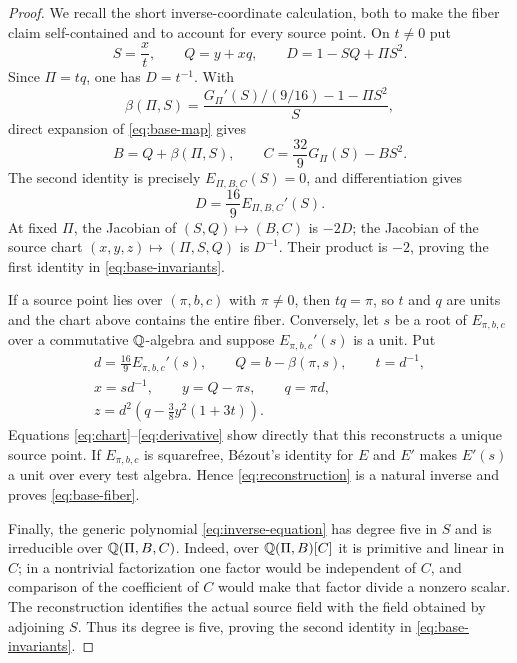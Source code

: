 \begin{proof}
We recall the short inverse-coordinate calculation, both to make the fiber
claim self-contained and to account for every source point.  On \(t\ne0\)
put
\begin{equation}
 S=\frac{x}{t},\qquad Q=y+xq,\qquad
 D=1-SQ+\Pi S^2.\label{eq:chart}
\end{equation}
Since \(\Pi=tq\), one has \(D=t^{-1}\).  With
\begin{equation}
 \beta(\Pi,S)
 =\frac{G_\Pi'(S)/(9/16)-1-\Pi S^2}{S},\label{eq:beta}
\end{equation}
direct expansion of \eqref{eq:base-map} gives
\begin{equation}
 B=Q+\beta(\Pi,S),\qquad
 C=\frac{32}{9}G_\Pi(S)-BS^2.\label{eq:compact-target}
\end{equation}
The second identity is precisely \(E_{\Pi,B,C}(S)=0\), and differentiation
gives
\begin{equation}
 D=\frac{16}{9}E_{\Pi,B,C}'(S).\label{eq:derivative}
\end{equation}
At fixed \(\Pi\), the Jacobian of \((S,Q)\mapsto(B,C)\) is \(-2D\);
the Jacobian of the source chart
\((x,y,z)\mapsto(\Pi,S,Q)\) is \(D^{-1}\).  Their product is \(-2\), proving
the first identity in \eqref{eq:base-invariants}.

If a source point lies over \((\pi,b,c)\) with \(\pi\ne0\), then
\(tq=\pi\), so \(t\) and \(q\) are units and the chart above contains the
entire fiber.  Conversely, let \(s\) be a root of \(E_{\pi,b,c}\) over a
commutative \(\mathbb Q\)-algebra and suppose \(E_{\pi,b,c}'(s)\) is a unit.  Put
\begin{equation}
 \begin{gathered}
 d=\frac{16}{9}E_{\pi,b,c}'(s),\qquad
 Q=b-\beta(\pi,s),\qquad t=d^{-1},\\
 x=sd^{-1},\qquad y=Q-\pi s,\qquad q=\pi d,\\
 z=d^2\left(q-\frac38y^2(1+3t)\right).
 \end{gathered}\label{eq:reconstruction}
\end{equation}
Equations \eqref{eq:chart}--\eqref{eq:derivative} show directly that this reconstructs a
unique source point.  If \(E_{\pi,b,c}\) is squarefree, B\'ezout's identity
for \(E\) and \(E'\) makes \(E'(s)\) a unit over every test algebra.  Hence
\eqref{eq:reconstruction} is a natural inverse and proves \eqref{eq:base-fiber}.

Finally, the generic polynomial \eqref{eq:inverse-equation} has degree five in \(S\) and is
irreducible over \(\mathbb Q(\Pi,B,C)\).  Indeed, over
\(\mathbb Q(\Pi,B)[C]\) it is primitive and linear in \(C\); in a nontrivial
factorization one factor would be independent of \(C\), and comparison of
the coefficient of \(C\) would make that factor divide a nonzero scalar.
The reconstruction identifies the actual source field with the field
obtained by adjoining \(S\).  Thus its degree is five, proving the second
identity in \eqref{eq:base-invariants}.
\end{proof}


